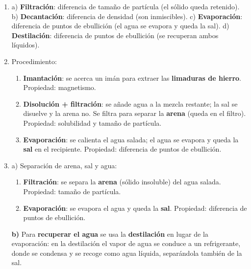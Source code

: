 \documentclass[12pt, letterpaper]{article}
\begin{document}
  \begin{enumerate}[leftmargin=*, label=\textbf{\arabic*.}]
    \item a) \textbf{Filtración}: diferencia de tamaño de partícula (el sólido queda retenido).
          \quad b) \textbf{Decantación}: diferencia de densidad (son inmiscibles).
          \quad c) \textbf{Evaporación}: diferencia de puntos de ebullición (el agua se evapora y queda la sal).
          \quad d) \textbf{Destilación}: diferencia de puntos de ebullición (se recuperan ambos líquidos).

    \item Procedimiento:
          \begin{enumerate}[label=\arabic*.]
            \item \textbf{Imantación}: se acerca un imán para extraer las \textbf{limaduras de hierro}. Propiedad: magnetismo.
            \item \textbf{Disolución + filtración}: se añade agua a la mezcla restante; la sal se disuelve y la arena no. Se filtra para separar la \textbf{arena} (queda en el filtro). Propiedad: solubilidad y tamaño de partícula.
            \item \textbf{Evaporación}: se calienta el agua salada; el agua se evapora y queda la \textbf{sal} en el recipiente. Propiedad: diferencia de puntos de ebullición.
          \end{enumerate}

    \item a) Separación de arena, sal y agua:
          \begin{enumerate}[label=\arabic*.]
            \item \textbf{Filtración}: se separa la \textbf{arena} (sólido insoluble) del agua salada. Propiedad: tamaño de partícula.
            \item \textbf{Evaporación}: se evapora el agua y queda la \textbf{sal}. Propiedad: diferencia de puntos de ebullición.
          \end{enumerate}
          \textbf{b)} Para \textbf{recuperar el agua} se usa la \textbf{destilación} en lugar de la evaporación: en la destilación el vapor de agua se conduce a un refrigerante, donde se condensa y se recoge como agua líquida, separándola también de la sal.
  \end{enumerate}

\fi
\end{document}
